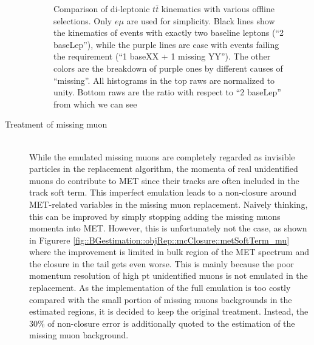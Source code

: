 \begin{description}
\begin{figure}[h]
    \caption{Comparison of di-leptonic $t\bar{t}$ kinematics with various offline selections. Only $e\mu$ are used for simplicity. Black lines show the kinematics of events with exactly two baseline leptons (``2 baseLep''), while the purple lines are case with events failing the requirement (``1 baseXX + 1 missing YY''). The other colors are the breakdown of purple ones by different causes of ``missing''. All histograms in the top raws are normalized to unity. Bottom raws are the ratio with respect to ``2 baseLep'' from which we can see    \label{fig::BGestimation::objRep::mcClosure::biasFrom2Lreq} }
\end{figure}
\fi

\item [Treatment of missing muon]  \mbox{} \\
While the emulated missing muons are completely regarded as invisible particles in the replacement algorithm, the momenta of real unidentified muons do contribute to MET since their tracks are often included in the track soft term. This imperfect emulation leads to a non-closure around MET-related variables in the missing muon replacement. Naively thinking, this can be improved by simply stopping adding the missing muons momenta into MET. However, this is unfortunately not the case, as shown in Figurere \ref{fig::BGestimation::objRep::mcClosure::metSoftTerm_mu} where the improvement is limited in bulk region of the MET spectrum and the closure in the tail gets even worse. This is mainly because the poor momentum resolution of high pt unidentified muons is not emulated in the replacement. As the implementation of the full emulation is too costly compared with the small portion of missing muons backgrounds in the estimated regions, it is decided to keep the original treatment. Instead, the $30\%$ of non-closure error is additionally quoted to the estimation of the missing muon background. \\


\end{description}
